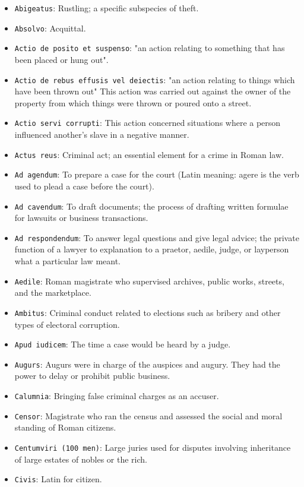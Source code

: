 \documentclass[11pt]{article}
\begin{document}
\begin{itemize}
\item \texttt{Abigeatus}: Rustling; a specific subspecies of theft.
\item \texttt{Absolvo}: Acquittal.
\item \texttt{Actio de posito et suspenso}: "an action relating to something that has been placed or hung out".
\item \texttt{Actio de rebus effusis vel deiectis}: "an action relating to things which have been thrown out" This action was carried out against the owner of the property from which things were thrown or poured onto a street.
\item \texttt{Actio servi corrupti}: This action concerned situations where a person influenced another's slave in a negative manner.
\item \texttt{Actus reus}: Criminal act; an essential element for a crime in Roman law.
\item \texttt{Ad agendum}: To prepare a case for the court (Latin meaning: agere is the verb used to plead a case before the court).
\item \texttt{Ad cavendum}: To draft documents; the process of drafting written formulae for lawsuits or business transactions.
\item \texttt{Ad respondendum}: To answer legal questions and give legal advice; the private function of a lawyer to explanation to a praetor, aedile, judge, or layperson what a particular law meant.
\item \texttt{Aedile}: Roman magistrate who supervised archives, public works, streets, and the marketplace.
\item \texttt{Ambitus}: Criminal conduct related to elections such as bribery and other types of electoral corruption.
\item \texttt{Apud iudicem}: The time a case would be heard by a judge.
\item \texttt{Augurs}: Augurs were in charge of the auspices and augury. They had the power to delay or prohibit public business.
\item \texttt{Calumnia}: Bringing false criminal charges as an accuser.
\item \texttt{Censor}: Magistrate who ran the census and assessed the social and moral standing of Roman citizens.
\item \texttt{Centumviri (100 men)}: Large juries used for disputes involving inheritance of large estates of nobles or the rich.
\item \texttt{Civis}: Latin for citizen.

\end{itemize}
\end{document}

